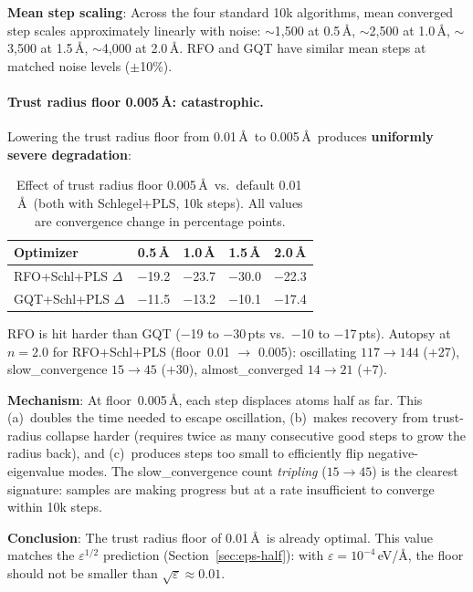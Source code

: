 \documentclass[11pt,a4paper]{article}
\theoremstyle{definition}
\begin{document}
\textbf{Mean step scaling}: Across the four standard 10k algorithms, mean
converged step scales approximately linearly with noise: $\sim$1{,}500 at
0.5\,\AA, $\sim$2{,}500 at 1.0\,\AA, $\sim$3{,}500 at 1.5\,\AA,
$\sim$4{,}000 at 2.0\,\AA.  RFO and GQT have similar mean steps at matched
noise levels ($\pm$10\%).

\paragraph{Trust radius floor 0.005\,\AA: catastrophic.}
Lowering the trust radius floor from 0.01\,\AA\ to 0.005\,\AA\ produces
\textbf{uniformly severe degradation}:

\begin{table}[h]
\centering
\caption{Effect of trust radius floor 0.005\,\AA\ vs.\ default 0.01\,\AA\
  (both with Schlegel+PLS, 10k steps).  All values are convergence change
  in percentage points.}
\label{tab:trf-effect}
\begin{tabular}{lcccc}
\toprule
Optimizer & 0.5\,\AA & 1.0\,\AA & 1.5\,\AA & 2.0\,\AA \\
\midrule
RFO+Schl+PLS $\Delta$ & $-$19.2 & $-$23.7 & $-$30.0 & $-$22.3 \\
GQT+Schl+PLS $\Delta$ & $-$11.5 & $-$13.2 & $-$10.1 & $-$17.4 \\
\bottomrule
\end{tabular}
\end{table}

RFO is hit harder than GQT ($-$19 to $-$30\,pts vs.\ $-$10 to $-$17\,pts).
Autopsy at $n=2.0$ for RFO+Schl+PLS (floor~0.01 $\to$ 0.005):
oscillating $117 \to 144$ ($+$27), slow\_convergence $15 \to 45$ ($+$30),
almost\_converged $14 \to 21$ ($+$7).

\textbf{Mechanism}: At floor~0.005\,\AA, each step displaces atoms half as
far.  This (a)~doubles the time needed to escape oscillation,
(b)~makes recovery from trust-radius collapse harder (requires twice as many
consecutive good steps to grow the radius back), and (c)~produces steps too
small to efficiently flip negative-eigenvalue modes.  The
slow\_convergence count \emph{tripling} ($15 \to 45$) is the clearest
signature: samples are making progress but at a rate insufficient to
converge within 10k steps.

\textbf{Conclusion}: The trust radius floor of 0.01\,\AA\ is already
optimal.  This value matches the $\varepsilon^{1/2}$ prediction
(Section~\ref{sec:eps-half}): with $\varepsilon = 10^{-4}$\,eV/\AA,
the floor should not be smaller than $\sqrt{\varepsilon} \approx 0.01$.
\end{document}
